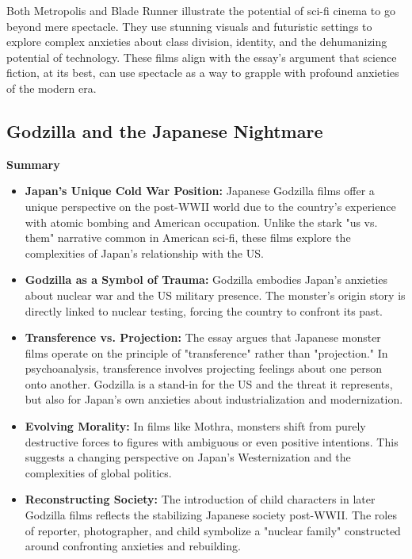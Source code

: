 \documentclass[11pt,fleqn]{book} %
\begin{document}
\vspace{5pt}

Both Metropolis and Blade Runner illustrate the potential of sci-fi cinema to go beyond mere spectacle. They use stunning visuals and futuristic settings to explore complex anxieties about class division, identity, and the dehumanizing potential of technology. These films align with the essay's argument that science fiction, at its best, can use spectacle as a way to grapple with profound anxieties of the modern era.

\subsection{Godzilla and the Japanese Nightmare}
\textbf{Summary}

\begin{itemize}
\item \textbf{Japan's Unique Cold War Position:} Japanese Godzilla films offer a unique perspective on the post-WWII world due to the country's experience with atomic bombing and American occupation. Unlike the stark "us vs. them" narrative common in American sci-fi, these films explore the complexities of Japan's relationship with the US.

\item \textbf{Godzilla as a Symbol of Trauma:} Godzilla embodies Japan's anxieties about nuclear war and the US military presence. The monster's origin story is directly linked to nuclear testing, forcing the country to confront its past.

\item \textbf{Transference vs. Projection:} The essay argues that Japanese monster films operate on the principle of "transference" rather than "projection." In psychoanalysis, transference involves projecting feelings about one person onto another. Godzilla is a stand-in for the US and the threat it represents, but also for Japan's own anxieties about industrialization and modernization.

\item \textbf{Evolving Morality:} In films like Mothra, monsters shift from purely destructive forces to figures with ambiguous or even positive intentions. This suggests a changing perspective on Japan's Westernization and the complexities of global politics.

\item \textbf{Reconstructing Society:} The introduction of child characters in later Godzilla films reflects the stabilizing Japanese society post-WWII. The roles of reporter, photographer, and child symbolize a "nuclear family" constructed around confronting anxieties and rebuilding.


\end{itemize}
\end{document}

